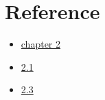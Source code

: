 \section{Reference}
\begin{itemize}
    \item \href{https://ccrgpages.rit.edu/~whelan/courses/2013_3fa_STAT_405/notes02.pdf}{chapter 2}
    \item \href{https://faculty.etsu.edu/gardnerr/4047/notes-Hogg-McKean-Craig/Hogg-McKean-Craig-2-1.pdf}{2.1}
    \item \href{https://faculty.etsu.edu/gardnerr/4047/notes-Hogg-McKean-Craig/Hogg-McKean-Craig-2-3.pdf}{2.3}
\end{itemize}